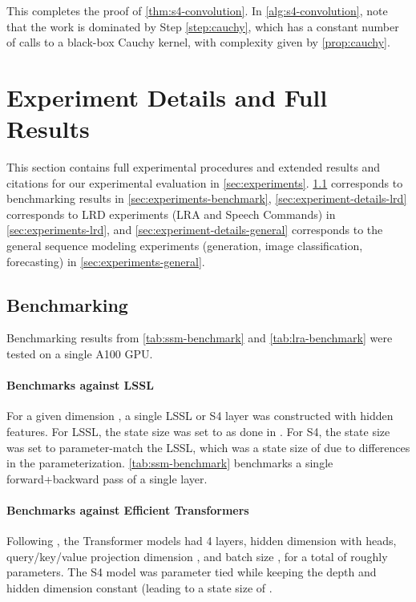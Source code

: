 \documentclass{article}
\newcommand{\methodabbrv}{S4}
\begin{document}
This completes the proof of \cref{thm:s4-convolution}.
In \cref{alg:s4-convolution},
note that the work is dominated by Step \ref{step:cauchy},
which has a constant number of calls to a black-box Cauchy kernel, with complexity given by \cref{prop:cauchy}.

 
\section{Experiment Details and Full Results}
\label{sec:experiment-details}

This section contains full experimental procedures and extended results and citations for our experimental evaluation in \cref{sec:experiments}.
\cref{sec:experiment-details-benchmarking} corresponds to benchmarking results in \cref{sec:experiments-benchmark},
\cref{sec:experiment-details-lrd} corresponds to LRD experiments (LRA and Speech Commands) in \cref{sec:experiments-lrd},
and \cref{sec:experiment-details-general} corresponds to the general sequence modeling experiments (generation, image classification, forecasting) in \cref{sec:experiments-general}.

\subsection{Benchmarking}
\label{sec:experiment-details-benchmarking}

Benchmarking results from \cref{tab:ssm-benchmark} and \cref{tab:lra-benchmark} were tested on a single A100 GPU.

\paragraph{Benchmarks against LSSL}

For a given dimension , a single LSSL or \methodabbrv{} layer was constructed with  hidden features.
For LSSL, the state size  was set to  as done in \citep{gu2021lssl}.
For \methodabbrv{}, the state size  was set to parameter-match the LSSL, which was a state size of  due to differences in the parameterization.
\cref{tab:ssm-benchmark} benchmarks a single forward+backward pass of a single layer.

\paragraph{Benchmarks against Efficient Transformers}
Following \citep{tay2021long}, the Transformer models had 4 layers, hidden dimension  with  heads, query/key/value projection dimension , and batch size , for a total of roughly  parameters.
The \methodabbrv{} model was parameter tied while keeping the depth and hidden dimension constant (leading to a state size of .
\end{document}
